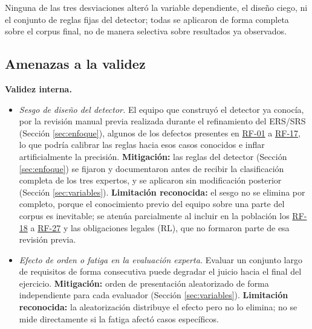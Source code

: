 \documentclass[journal,onecolumn]{IEEEtran}
\begin{document}
Ninguna de las tres desviaciones alteró la variable dependiente, el diseño
ciego, ni el conjunto de reglas fijas del detector; todas se aplicaron de
forma completa sobre el corpus final, no de manera selectiva sobre
resultados ya observados.

\subsection{Amenazas a la validez}
\label{sec:amenazas}

\textbf{Validez interna.}
\begin{itemize}[leftmargin=*]
	\item \emph{Sesgo de diseño del detector.} El equipo que construyó el
	detector ya conocía, por la revisión manual previa realizada durante
	el refinamiento del ERS/SRS (Sección \ref{sec:enfoque}), algunos
	de los defectos presentes en \hyperref[tab:RF-01]{RF-01} a \hyperref[tab:RF-17]{RF-17}, lo que podría calibrar
	las reglas hacia esos casos conocidos e inflar artificialmente la
	precisión. \textbf{Mitigación:}
	las reglas del detector (Sección \ref{sec:enfoque}) se fijaron y
	documentaron antes de recibir la clasificación completa de los tres
	expertos, y se aplicaron sin modificación posterior
	(Sección \ref{sec:variables}). \textbf{Limitación reconocida:} el
	sesgo no se elimina por completo, porque el conocimiento previo del
	equipo sobre una parte del corpus es inevitable; se atenúa
	parcialmente al incluir en la población los \hyperref[tab:RF-18]{RF-18} a \hyperref[tab:RF-27]{RF-27} y las
	obligaciones legales (RL), que no formaron parte de esa revisión previa.
	\item \emph{Efecto de orden o fatiga en la evaluación experta.}
	Evaluar un conjunto largo de requisitos de forma consecutiva puede
	degradar el juicio hacia el final del ejercicio. \textbf{Mitigación:}
	orden de presentación aleatorizado de forma independiente para cada
	evaluador (Sección \ref{sec:variables}). \textbf{Limitación
		reconocida:} la aleatorización distribuye el efecto pero no lo
	elimina; no se mide directamente si la fatiga afectó casos
	específicos.
\end{itemize}
\end{document}
